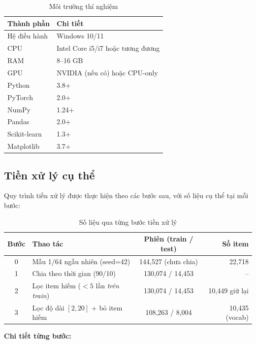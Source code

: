 \documentclass[12pt, a4paper]{article}
\begin{document}
\begin{table}[H]
\centering
\caption{Môi trường thí nghiệm}
\label{tab:environment}
\begin{tabular}{ll}
\toprule
\textbf{Thành phần} & \textbf{Chi tiết} \\
\midrule
Hệ điều hành & Windows 10/11 \\
CPU & Intel Core i5/i7 hoặc tương đương \\
RAM & 8--16 GB \\
GPU & NVIDIA (nếu có) hoặc CPU-only \\
\midrule
Python & 3.8+ \\
PyTorch & 2.0+ \\
NumPy & 1.24+ \\
Pandas & 2.0+ \\
Scikit-learn & 1.3+ \\
Matplotlib & 3.7+ \\
\bottomrule
\end{tabular}
\end{table}

\subsection{Tiền xử lý cụ thể}

Quy trình tiền xử lý được thực hiện theo các bước sau, với số liệu cụ thể tại mỗi bước:

\begin{table}[H]
\centering
\caption{Số liệu qua từng bước tiền xử lý}
\label{tab:preprocess_stats}
\begin{tabular}{clcr}
\toprule
\textbf{Bước} & \textbf{Thao tác} & \textbf{Phiên (train / test)} & \textbf{Số item} \\
\midrule
0 & Mẫu 1/64 ngẫu nhiên (seed=42) & 144,527 (chưa chia) & 22,718 \\
1 & Chia theo thời gian (90/10) & 130,074 / 14,453 & -- \\
2 & Lọc item hiếm ($<5$ lần \emph{trên train}) & 130,074 / 14,453 & 10,449 giữ lại \\
3 & Lọc độ dài $[2,20]$ + bỏ item hiếm & 108,263 / 8,004 & 10,435 (vocab) \\
\bottomrule
\end{tabular}
\end{table}

\textbf{Chi tiết từng bước:}
\end{document}
